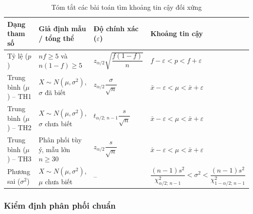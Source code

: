 \documentclass[12pt,a4paper]{article}
\newcommand{\xbar}{\bar{x}}
\begin{document}
\begin{table}[H]
\centering
\caption{Tóm tắt các bài toán tìm khoảng tin cậy đối xứng}
\label{tab:ktc}
\small
\begin{tabular}{L{3cm} L{4.2cm} L{3.4cm} L{3.8cm}}
\toprule
Dạng tham số & Giả định mẫu / tổng thể & Độ chính xác ($\varepsilon$) & Khoảng tin cậy \\
\midrule
Tỷ lệ ($p$) & $nf \ge 5$ và $n(1-f) \ge 5$ &
  $z_{\alpha/2}\sqrt{\dfrac{f(1-f)}{n}}$ & $f - \varepsilon < p < f + \varepsilon$ \\
\midrule
Trung bình ($\mu$) -- TH1 & $X \sim N(\mu,\sigma^2)$, $\sigma$ đã biết &
  $z_{\alpha/2}\dfrac{\sigma}{\sqrt{n}}$ & $\xbar - \varepsilon < \mu < \xbar + \varepsilon$ \\
\midrule
Trung bình ($\mu$) -- TH2 & $X \sim N(\mu,\sigma^2)$, $\sigma$ chưa biết &
  $t_{\alpha/2;\,n-1}\dfrac{s}{\sqrt{n}}$ & $\xbar - \varepsilon < \mu < \xbar + \varepsilon$ \\
\midrule
Trung bình ($\mu$) -- TH3 & Phân phối tùy ý, mẫu lớn $n \ge 30$ &
  $z_{\alpha/2}\dfrac{s}{\sqrt{n}}$ & $\xbar - \varepsilon < \mu < \xbar + \varepsilon$ \\
\midrule
Phương sai ($\sigma^2$) & $X \sim N(\mu,\sigma^2)$, $\mu$ chưa biết & -- &
  $\dfrac{(n-1)s^2}{\chi^2_{\alpha/2;\,n-1}} < \sigma^2 < \dfrac{(n-1)s^2}{\chi^2_{1-\alpha/2;\,n-1}}$ \\
\bottomrule
\end{tabular}
\end{table}

\subsubsection{Kiểm định phân phối chuẩn}
\end{document}
